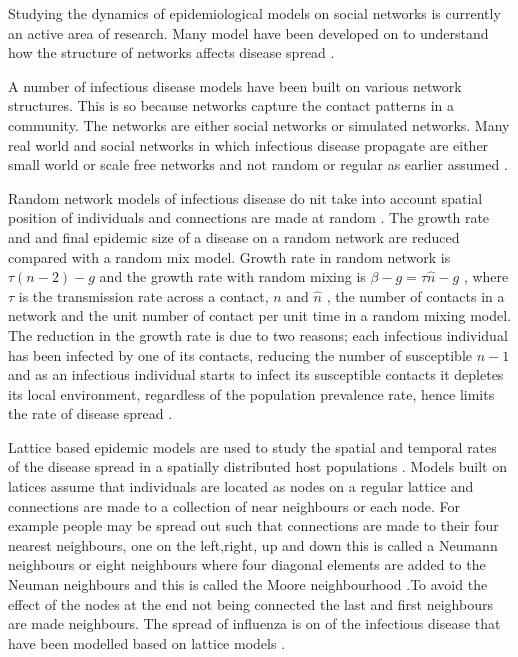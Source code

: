 Studying the dynamics of epidemiological models on social networks is currently an active area of research. Many model have been developed on to understand  how the structure of networks affects disease spread \citep{keeling2005networks}.

A number of infectious disease models have been built on various network structures. This is so because networks capture the contact patterns in a community. The networks are either social networks or simulated networks. Many real world and social networks in which infectious disease propagate are either small world or scale free networks and not random or regular as earlier assumed \cite{watts1998collective}.

Random network models of infectious disease do nit take into account spatial position of individuals and connections are made at random \citep{keeling2005networks}. The growth rate and and final epidemic size of a disease on a random network are reduced compared with a random mix model. Growth rate in random network is $\tau (n -2) -g$ and the growth rate with random mixing is $\beta -g = \tau \widehat{n} -g$ , where  $\tau$ is the transmission rate across a contact, $n$ and $\widehat{n} $ , the number of contacts in a network and the unit number of contact per unit time in a random mixing model.
The reduction in the growth rate is due to two reasons; each infectious individual has been infected by one of its contacts, reducing the number of susceptible $n-1$ and as an infectious individual starts to infect its susceptible contacts it depletes its local environment, regardless of the population prevalence rate, hence limits the rate of disease spread \citep{keeling2005networks}.

Lattice based epidemic models are used to study the spatial and temporal rates of the disease spread in  a spatially distributed host populations \citep{rhodes1997epidemic}. Models built on latices assume that individuals are located as nodes on a regular lattice and connections are made to a collection of near neighbours or each node. For example people may be spread out such that connections are made to their four nearest neighbours, one on the left,right, up and down this is called a Neumann
neighbours  or eight neighbours where four diagonal elements are added to the Neuman neighbours and this is called the Moore neighbourhood \citep{lloyd2006infection}.To avoid the effect of the nodes at the end not being connected the last and first neighbours are made neighbours. The spread of influenza is on of the infectious disease that have been modelled based on lattice models \cite{liccardo2013lattice}. 

